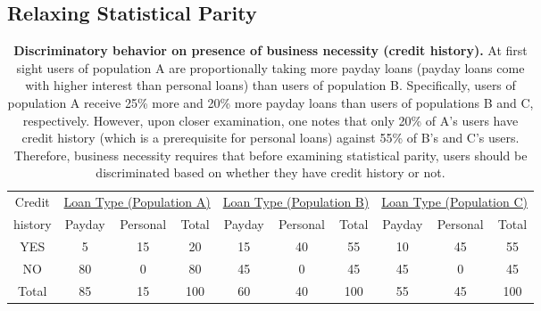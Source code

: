 \subsection{Relaxing Statistical Parity}
\label{sect:relaxedstatparity}
\begin{table*}[t]
{ \small
  \center
  \renewcommand{\arraystretch}{1.5}
  \begin{tabular}{ c | c c c | c c c | c c c}
    Credit
    & \multicolumn{3}{|c|}{\underline{Loan Type (Population A)}}
    & \multicolumn{3}{|c}{\underline{Loan Type (Population B) }}
    & \multicolumn{3}{|c}{\underline{Loan Type (Population C) }} \\
    history & Payday & Personal & Total & Payday & Personal & Total & Payday & Personal & Total \\
    \hline
    YES & 5  & 15 & 20 & 15 & 40 & 55 & 10 & 45 & 55 \\
    NO  & 80 & 0  & 80 & 45 & 0 & 45 & 45 & 0 & 45\\
    \hline
    Total & 85 & 15 & 100 & 60 & 40 & 100 & 55 & 45 & 100\\
  \end{tabular}
  \caption{{\bf Discriminatory behavior on presence of business necessity (credit history).}
    At first sight users of population A are proportionally taking more payday loans
    (payday loans come with higher interest than personal loans) than users of population B.
    Specifically, users of population A receive 25\% more and 20\% more  payday loans than
    users of populations B and C, respectively. However, upon closer examination, one notes
    that only 20\% of A's users have credit history (which is a prerequisite for personal
    loans) against 55\% of B's and C's users. Therefore, business necessity requires that
    before examining statistical parity, users should be discriminated based on whether
    they have credit history or not.
  }
  \label{tab:BusinessNessecityA}
}
\end{table*}

